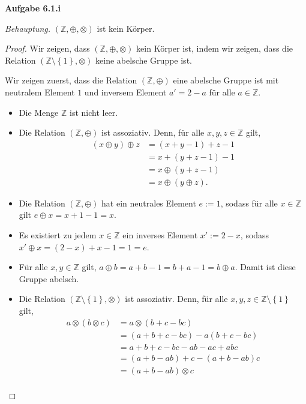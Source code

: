 \documentclass[12pt]{extarticle}
\newcommand{\mg}[1]{\mathbb{#1}}
\begin{document}
\textbf{Aufgabe 6.1.i}

\textit{Behauptung.}  \((\mg{Z}, \oplus, \otimes)\) ist kein Körper.

\begin{proof}
  Wir zeigen, dass \((\mg{Z}, \oplus, \otimes)\) kein Körper ist,
  indem wir zeigen, dass die Relation
  \((\mg{Z}\setminus \left\{ 1 \right\}, \otimes)\) keine abelsche
  Gruppe ist.

  Wir zeigen zuerst, dass die Relation \((\mg{Z}, \oplus)\) eine
  abelsche Gruppe ist mit neutralem Element \(1\) und inversem Element
  \(a'=2-a\) für alle \(a \in \mg{Z}\).

  \begin{itemize}
  \item Die Menge \(\mg{Z}\) ist nicht leer.

  \item Die Relation \((\mg{Z}, \oplus)\) ist assoziativ.
    Denn, für alle \(x, y, z \in \mg{Z}\) gilt,
\begin{align*}
  (x \oplus y) \oplus z &= (x+y-1)+z-1\\
                        &= x+(y+z-1)-1\\
                        &= x \oplus(y+z-1)\\
  &= x \oplus(y\oplus z).
\end{align*}
\item  Die Relation \((\mg{Z}, \oplus)\) hat ein neutrales Element
  \(e:=1\), sodass für alle \(x \in \mg{Z}\) gilt $e \oplus x = x + 1 -
  1 =x$.
\item Es existiert zu jedem \(x \in \mg{Z}\) ein inverses Element
  \(x':=2-x\), sodass \(x' \oplus x=(2-x) + x - 1 = 1 = e\).
\item Für alle \(x, y \in \mg{Z}\) gilt, $a \oplus b = a + b - 1 = b
  + a - 1 = b \oplus a$.  Damit ist diese Gruppe abelsch.
\item Die Relation \((\mg{Z}\setminus \left\{ 1 \right\}, \otimes)\)
  ist assoziativ.
  Denn, für alle \(x, y, z \in \mg{Z}\setminus \left\{ 1 \right\}\)
  gilt,
\begin{align*}
  a \otimes (b \otimes c) &= a \otimes (b+c - bc)\\
                          &= (a+b+c - bc) - a(b+c-bc)\\
                          &= a+b+c-bc-ab-ac+abc \\
                          &= (a+b-ab)+c - (a+b-ab)c\\
                          &= (a+b - ab) \otimes c\\

\end{align*}
\end{itemize}
\end{proof}
\end{document}
